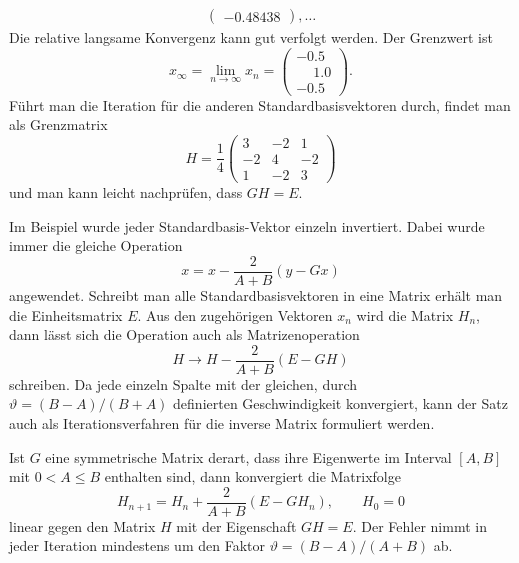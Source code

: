 \begin{beispiel}
\begin{align*}
\begin{pmatrix}
  -0.48438
\end{pmatrix},
\dots
\end{align*}
Die relative langsame Konvergenz kann gut verfolgt werden.
Der Grenzwert ist
\[
x_{\infty} = \lim_{n\to\infty}x_n = \begin{pmatrix}
-0.5\\\phantom{-}1.0\\-0.5
\end{pmatrix}.
\]
Führt man die Iteration für die anderen Standardbasisvektoren durch,
findet man als Grenzmatrix
\[
H=\frac14\begin{pmatrix}
 3&-2& 1\\
-2& 4&-2\\
 1&-2& 3
\end{pmatrix}
\]
und man kann leicht nachprüfen, dass $GH=E$.
\end{beispiel}

Im Beispiel wurde jeder Standardbasis-Vektor einzeln invertiert.
Dabei wurde immer die gleiche Operation
\[
x = x - \frac{2}{A+B}(y - Gx)
\]
angewendet.
Schreibt man alle Standardbasisvektoren in eine Matrix erhält man 
die Einheitsmatrix $E$. Aus den zugehörigen Vektoren $x_n$
wird die Matrix $H_n$, dann lässt sich die Operation auch als
Matrizenoperation
\[
H \to H - \frac{2}{A+B}(E - GH)
\]
schreiben.
Da jede einzeln Spalte mit der gleichen, durch $\vartheta = (B-A)/(B+A)$
definierten Geschwindigkeit konvergiert, kann der Satz auch als
Iterationsverfahren für die inverse Matrix formuliert werden.

\begin{satz}
Ist $G$ eine symmetrische Matrix derart, dass ihre Eigenwerte im
Interval $[A,B]$ mit $0<A\le B$ enthalten sind, dann konvergiert
die Matrixfolge
\[
H_{n+1}
=
H_n
+
\frac{2}{A+B}
(
E-
GH_n
)
,
\qquad
H_0=0
\]
linear gegen den Matrix $H$ mit der Eigenschaft $GH=E$.
Der Fehler nimmt in jeder Iteration mindestens um den Faktor
$\vartheta=(B-A)/(A+B)$ ab.
\end{satz}








